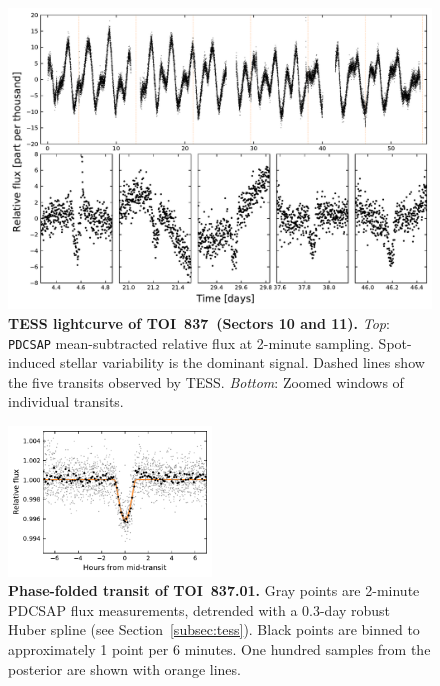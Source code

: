 \documentclass[12pt,twocolumn,tighten]{aastex62}
\newcommand{\tn}{TOI~837} %
\newcommand{\pn}{TOI~837.01} %
\begin{document}
\begin{figure}[t!]
	\begin{center}
		\leavevmode
		\includegraphics[width=1\textwidth]{f1.pdf}
	\end{center}
	\vspace{-0.7cm}
	\caption{
    {\bf TESS lightcurve of \tn\ (Sectors 10 and 11).}
		{\it Top}: \texttt{PDCSAP} mean-subtracted relative flux at 2-minute
		sampling. Spot-induced stellar variability is the dominant signal.  Dashed
		lines show the five transits observed by TESS.
    {\it Bottom}: Zoomed windows of individual transits.
		\label{fig:rawzoom}
	}
\end{figure}

\begin{figure}[t!]
	\begin{center}
		\leavevmode
		\includegraphics[width=0.48\textwidth]{f2.pdf}
	\end{center}
	\vspace{-0.7cm}
	\caption{
    {\bf Phase-folded transit of \pn.} Gray points are
    2-minute PDCSAP flux measurements, detrended with
    a 0.3-day robust Huber spline (see Section~\ref{subsec:tess}).
    Black points are binned to approximately 1 point per 6 minutes.
    One hundred samples from the posterior are shown with orange lines.
    \label{fig:phasefold}
	}
\end{figure}
\end{document}
